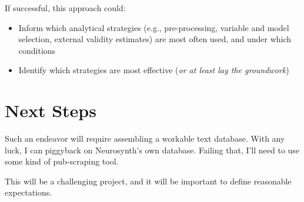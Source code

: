 \documentclass[]{article}
\begin{document}
If successful, this approach could:
\begin{itemize}
	\item Inform which analytical strategies (e.g., pre-processing, variable and model selection, external validity estimates) are most often used, and under which conditions
	\item Identify which strategies are most effective (\textit{or at least lay the groundwork})
\end{itemize}


\section{Next Steps}

Such an endeavor will require assembling a workable text database. With any luck, I can piggyback on Neurosynth's own database. Failing that, I'll need to use some kind of pub-scraping tool.

This will be a challenging project, and it will be important to define reasonable expectations. 




\end{document}
